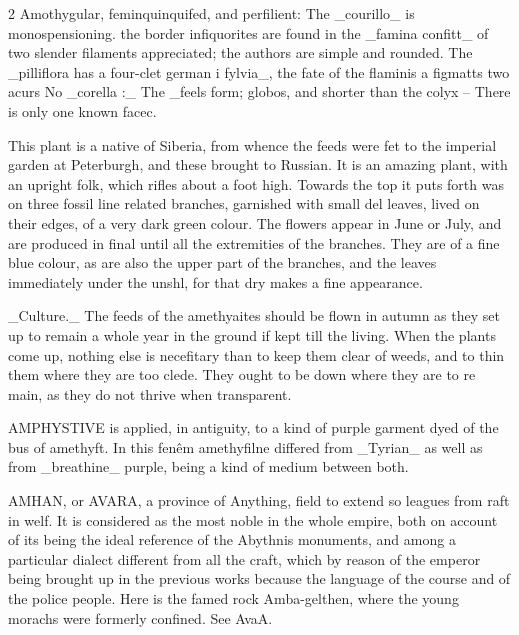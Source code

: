 \documentclass[10pt]{article}
\begin{document}
\begin{multicols}{2}\raggedcolumns
Amothygular, feminquinquifed, and perfilient: The \_courillo\_ is monospensioning. the border infiquorites are found in the \_famina confitt\_ of two slender filaments appreciated; the authors are simple and rounded. The \_pilliflora has a four-clet german i fylvia\_, the fate of the flaminis a figmatts two acurs No \_corella :\_ The \_feels form; globos, and shorter than the colyx – There is only one known facec.

This plant is a native of Siberia, from whence the feeds were fet to the imperial garden at Peterburgh, and these brought to Russian. It is an amazing plant, with an upright folk, which rifles about a foot high. Towards the top it puts forth was on three fossil line related branches, garnished with small del leaves, lived on their edges, of a very dark green colour. The flowers appear in June or July, and are produced in final until all the extremities of the branches. They are of a fine blue colour, as are also the upper part of the branches, and the leaves immediately under the unshl, for that dry makes a fine appearance.

\_Culture.\_ The feeds of the amethyaites should be flown in autumn as they set up to remain a whole year in the ground if kept till the living. When the plants come up, nothing else is necefitary than to keep them clear of weeds, and to thin them where they are too clede. They ought to be down where they are to re main, as they do not thrive when transparent.

AMPHYSTIVE is applied, in antiguity, to a kind of purple garment dyed of the bus of amethyft. In this fenêm amethyfilne differed from \_Tyrian\_ as well as from \_breathine\_ purple, being a kind of medium between both.

AMHAN, or AVARA, a province of Anything, field to extend so leagues from raft in welf. It is considered as the most noble in the whole empire, both on account of its being the ideal reference of the Abythnis monuments, and among a particular dialect different from all the craft, which by reason of the emperor being brought up in the previous works because the language of the course and of the police people. Here is the famed rock Amba-gelthen, where the young morachs were formerly confined. See AvaA.


\end{multicols}
\end{document}
